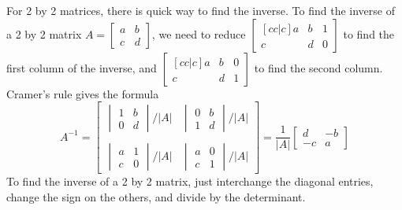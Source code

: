 For 2 by 2 matrices, there is quick way to find the inverse. 
To find the inverse of a 2 by 2 matrix $A=\begin{bmatrix}a&b\\c&d\end{bmatrix}$, we need to reduce $\begin{bmatrix}[cc|c]a&b&1\\c&d&0\end{bmatrix}$ to find the first column of the inverse, and $\begin{bmatrix}[cc|c]a&b&0\\c&d&1\end{bmatrix}$ to find the second column.  
Cramer's rule gives the formula 
%
$$A^{-1}=
\begin{bmatrix}
\begin{vmatrix}1&b\\0&d\end{vmatrix}/|A|&\begin{vmatrix}0&b\\1&d\end{vmatrix}/|A|\\ \\
\begin{vmatrix}a&1\\c&0\end{vmatrix}/|A|&\begin{vmatrix}a&0\\c&1\end{vmatrix}/|A|\end{bmatrix} 
= \frac{1}{|A|}
\begin{bmatrix}d&-b\\-c&a\end{bmatrix}
$$
To find the inverse of a 2 by 2 matrix, just interchange the diagonal entries, change the sign on the others, and divide by the determinant.


